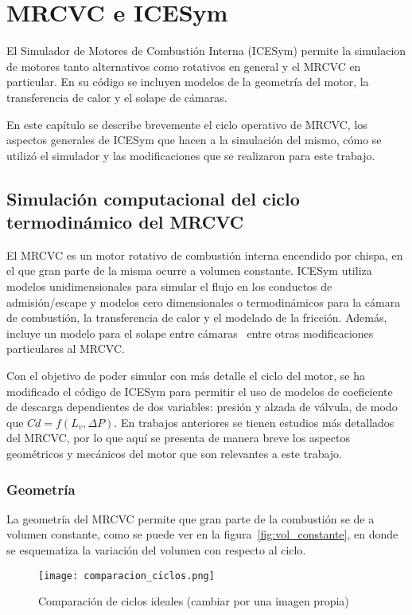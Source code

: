 \chapter{MRCVC e ICESym}

El Simulador de Motores de Combustión Interna (ICESym) permite la simulacion de
motores tanto alternativos como rotativos en general y el MRCVC en particular.
%
En su código se incluyen modelos de la geometría del motor, la transferencia
de calor y el solape de cámaras.

En este capítulo se describe brevemente el ciclo operativo de MRCVC, los
aspectos generales de ICESym que hacen a la simulación del mismo, cómo se
utilizó el simulador y las modificaciones que se realizaron para este trabajo.

\section{Simulación computacional del ciclo termodinámico del MRCVC}

El MRCVC es un motor rotativo de combustión interna encendido por chispa, en el
que gran parte de la misma ocurre a volumen constante.
%
ICESym utiliza modelos unidimensionales para simular el flujo en los conductos
de admisión/escape y modelos cero dimensionales o termodinámicos para la cámara
de combustión, la transferencia de calor y el modelado de la fricción.
%
Además, incluye un modelo para el solape entre cámaras~\cite{lopez16} entre
otras modificaciones particulares al MRCVC.\@

Con el objetivo de poder simular con más detalle el ciclo del motor, se ha
modificado el código de ICESym para permitir el uso de modelos de coeficiente
de descarga dependientes de dos variables: presión y alzada de válvula, de modo
que $Cd = f(L_v, \Delta P)$.
%
En trabajos anteriores se tienen estudios más detallados del MRCVC, por lo que
aquí se presenta de manera breve los aspectos geométricos y mecánicos del motor
que son relevantes a este trabajo.

\subsection{Geometría}
%
La geometría del MRCVC permite que gran parte de la combustión se de a volumen
constante\cite{mrcvc_geom}, como se puede ver en la figura~\ref{fig:vol_constante},
en donde se esquematiza la variación del volumen con respecto al ciclo.

\begin{figure}
    \centering
    \texttt{[image: comparacion\_ciclos.png]}
    \caption{Comparación de ciclos ideales (cambiar por una imagen propia)}\label{fig:comparacion_ciclos}
\end{figure}



